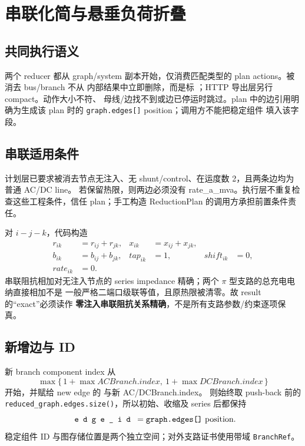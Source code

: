 
\section{串联化简与悬垂负荷折叠}\label{sec:gr-series-pendant}

\subsection{共同执行语义}

两个 reducer 都从 graph/system 副本开始，仅消费匹配类型的 plan actions。被消去 bus/branch 不从
内部结果中立即删除，而是标 ；HTTP 导出层另行 compact。动作大小不符、
母线/边找不到或边已停运时跳过。plan 中的边引用明确为生成该 plan 时的
\texttt{graph.edges[]} position；调用方不能把稳定组件  填入该字段。

\subsection{串联适用条件}

计划层已要求被消去节点无注入、无 shunt/control、在运度数 2，且两条边均为普通 AC/DC line。
若保留热限，则两边必须没有 rate\_a\_mva。执行层不重复检查这些工程条件，信任 plan；手工构造
ReductionPlan 的调用方承担前置条件责任。

对 $i-j-k$，代码构造
\begin{align}
r_{ik}&=r_{ij}+r_{jk},&x_{ik}&=x_{ij}+x_{jk},\\
b_{ik}&=b_{ij}+b_{jk},&tap_{ik}&=1,&shift_{ik}&=0,\\
rate_{ik}&=0.
\end{align}
串联阻抗相加对无注入节点的 series impedance 精确；两个 $\pi$ 型支路的总充电电纳直接相加不是
一般严格二端口级联等值，且原热限被清零。故 result 的“exact”必须读作
\textbf{零注入串联阻抗关系精确}，不是所有支路参数/约束逐项保真。

\subsection{新增边与 ID}

新 branch component index 从
\begin{equation}
\max\{\,1+\max ACBranch.index,\ 1+\max DCBranch.index\,\}
\end{equation}
开始，并赋给 new edge 的  与新 AC/DCBranch.index。 则始终取
push-back 前的 \texttt{reduced\_graph.edges.size()}，所以初始、收缩及 series 后都保持
\begin{equation}
\fld{edge\_id}=\texttt{graph.edges[]}\text{ position}.
\end{equation}
稳定组件 ID 与图存储位置是两个独立空间；对外支路证书使用带域 \texttt{BranchRef}。

